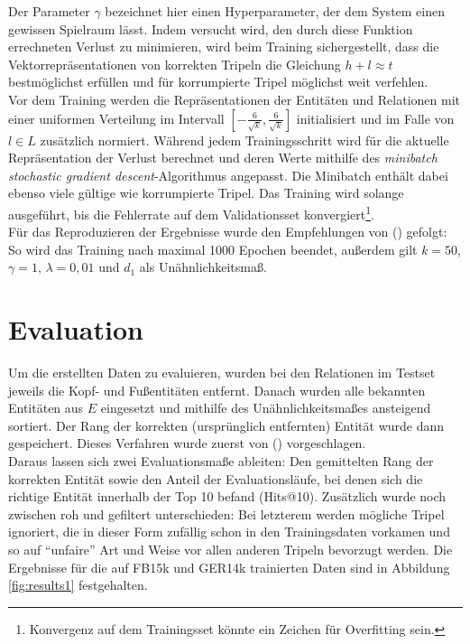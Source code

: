Der Parameter $\gamma$ bezeichnet hier einen Hyperparameter, der dem System einen gewissen Spielraum lässt. Indem versucht
wird, den durch diese Funktion errechneten Verlust zu minimieren, wird beim Training sichergestellt, dass die Vektorrepräsentationen
von korrekten Tripeln die Gleichung $h + l \approx t$ bestmöglichst erfüllen und für korrumpierte Tripel möglichst weit
verfehlen.\\

Vor dem Training werden die Repräsentationen der Entitäten und Relationen mit einer uniformen Verteilung im Intervall
$[-\frac{6}{\sqrt{k}}, \frac{6}{\sqrt{k}}]$ initialisiert und im Falle von $l \in L$ zusätzlich normiert. Während jedem
Trainingsschritt wird für die aktuelle Repräsentation der Verlust berechnet und deren Werte mithilfe des
\emph{minibatch stochastic gradient descent}-Algorithmus angepasst. Die Minibatch enthält dabei ebenso viele gültige wie korrumpierte Tripel.
Das Training wird solange ausgeführt, bis die Fehlerrate auf dem Validationsset konvergiert\footnote{Konvergenz auf dem
Trainingsset könnte ein Zeichen für Overfitting sein.}.\\

Für das Reproduzieren der Ergebnisse wurde den Empfehlungen von (\cite{bordes2013translating}) gefolgt: So wird das Training
nach maximal 1000 Epochen beendet, außerdem gilt $k = 50$, $\gamma = 1$, $\lambda = 0,01$ und $d_1$ als Unähnlichkeitsmaß.

\section{Evaluation}\label{sec:transe-eval}

Um die erstellten Daten zu evaluieren, wurden bei den Relationen im Testset jeweils die Kopf- und Fußentitäten entfernt.
Danach wurden alle bekannten Entitäten aus $E$ eingesetzt und mithilfe des Unähnlichkeitsmaßes ansteigend sortiert. Der Rang
der korrekten (ursprünglich entfernten) Entität wurde dann gespeichert. Dieses Verfahren wurde zuerst von (\cite{bordes2011learning})
vorgeschlagen.\\

Daraus lassen sich zwei Evaluationsmaße ableiten: Den gemittelten Rang der korrekten Entität sowie den Anteil
der Evaluationsläufe, bei denen sich die richtige Entität innerhalb der Top 10 befand (Hits@10). Zusätzlich wurde noch
zwischen roh und gefiltert unterschieden: Bei letzterem werden mögliche Tripel ignoriert, die in dieser Form zufällig schon in
den Trainingsdaten vorkamen und so auf ``unfaire'' Art und Weise vor allen anderen Tripeln bevorzugt werden.
Die Ergebnisse für die auf FB15k und GER14k trainierten Daten sind in Abbildung \ref{fig:results1} festgehalten.

